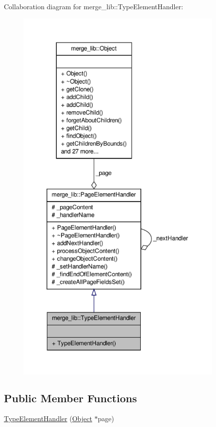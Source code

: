 Collaboration diagram for merge\-\_\-lib\-:\-:Type\-Element\-Handler\-:
\nopagebreak
\begin{figure}[H]
\begin{center}
\leavevmode
\includegraphics[height=550pt]{dc/d00/classmerge__lib_1_1_type_element_handler__coll__graph}
\end{center}
\end{figure}
\subsection*{Public Member Functions}
\begin{DoxyCompactItemize}
\item 
\hyperlink{classmerge__lib_1_1_type_element_handler_af626b1282df4e3a1577c3ae0347bb20f}{Type\-Element\-Handler} (\hyperlink{classmerge__lib_1_1_object}{Object} $\ast$page)
\end{DoxyCompactItemize}
